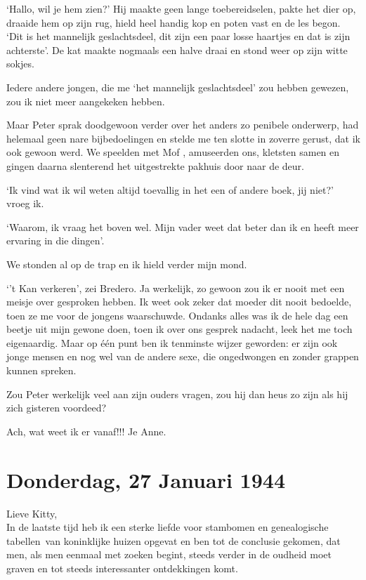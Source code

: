 \documentclass{book}
\begin{document}
`Hallo, wil je hem zien?' Hij maakte geen lange toebereidselen, pakte het dier
op, draaide hem op zijn rug, hield heel handig kop en poten vast en de les
begon. `Dit is het mannelijk geslachtsdeel, dit zijn een paar losse haartjes en
dat is zijn achterste'. De kat maakte nogmaals een halve draai en stond weer op
zijn witte sokjes.

Iedere andere jongen, die me `het mannelijk geslachtsdeel' zou hebben gewezen,
zou ik niet meer aangekeken hebben.

Maar Peter sprak doodgewoon verder over het anders zo penibele onderwerp, had
helemaal geen nare bijbedoelingen en stelde me ten slotte in zoverre gerust, dat
ik ook gewoon werd. We speelden met Mof , amuseerden ons, kletsten samen en
gingen daarna slenterend het uitgestrekte pakhuis door naar de deur.

`Ik vind wat ik wil weten altijd toevallig in het een of andere boek, jij niet?'
vroeg ik.

`Waarom, ik vraag het boven wel. Mijn vader weet dat beter dan ik en heeft meer
ervaring in die dingen'.

We stonden al op de trap en ik hield verder mijn mond.

`'t Kan verkeren', zei Bredero. Ja werkelijk, zo gewoon zou ik er nooit met een
meisje over gesproken hebben. Ik weet ook zeker dat moeder dit nooit bedoelde,
toen ze me voor de jongens waarschuwde. Ondanks alles was ik de hele dag een
beetje uit mijn gewone doen, toen ik over ons gesprek nadacht, leek het me toch
eigenaardig. Maar op één punt ben ik tenminste wijzer geworden: er zijn ook
jonge mensen en nog wel van de andere sexe, die ongedwongen en zonder grappen
kunnen spreken.

Zou Peter werkelijk veel aan zijn ouders vragen, zou hij dan heus zo zijn als
hij zich gisteren voordeed?

Ach, wat weet ik er vanaf!!! Je Anne.

\section*{Donderdag, 27 Januari 1944}

Lieve Kitty,\\
In de laatste tijd heb ik een sterke liefde voor stambomen en
genealogische tabellen~van koninklijke huizen opgevat en ben tot de conclusie
gekomen, dat men, als men eenmaal met zoeken begint, steeds verder in de oudheid
moet graven en tot steeds interessanter ontdekkingen komt.
\end{document}
